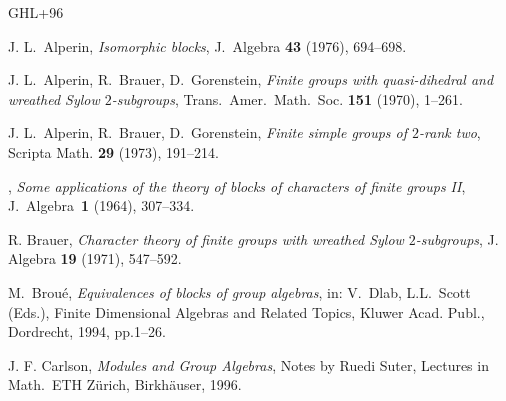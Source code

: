 \documentclass[12pt,a4paper]{amsart}
\theoremstyle{plain}\newtheorem{Theorem}{Theorem}[section]
\theoremstyle{plain}\newtheorem{Conjecture}[Theorem]{Conjecture}
\theoremstyle{plain}\newtheorem{Corollary}[Theorem]{Corollary}
\theoremstyle{plain}\newtheorem{Lemma}[Theorem]{Lemma}
\theoremstyle{plain}\newtheorem{Proposition}[Theorem]{Proposition}
\theoremstyle{definition}\newtheorem{Definition}[Theorem]{Definition}
\theoremstyle{definition}\newtheorem{Example}[Theorem]{Example}
\theoremstyle{definition}\newtheorem{Examples}[Theorem]{Examples}
\theoremstyle{definition}\newtheorem{Remark}[Theorem]{Remark}
\theoremstyle{definition}\newtheorem{Question}[Theorem]{Question}
\theoremstyle{definition}\newtheorem{Notation}[Theorem]{Notation}
\theoremstyle{definition}\newtheorem{Hypothesis}[Theorem]{Hypothesis}
\theoremstyle{definition}\newtheorem{Assumption}[Theorem]{Assumption}
\theoremstyle{definition}\newtheorem{Strategy}[Theorem]{Strategy}
\theoremstyle{definition}\newtheorem{Contents}[Theorem]{Contents}
\theoremstyle{definition}\newtheorem{Computations}[Theorem]{Computations}
\theoremstyle{definition}\newtheorem{Equivalences}[Theorem]{Equivalences}
\theoremstyle{definition}\newtheorem{Notation/Definition}[Theorem]{Notation/Definition}
\theoremstyle{definition}\newtheorem{noth}[Theorem]{}
\theoremstyle{plain}\newtheorem{Step}[Theorem]{Step}
\begin{document}
\begin{thebibliography}{GHL+96}

{\sc J. L.~Alperin}, \emph{Isomorphic blocks}, J.~Algebra \textbf{43} (1976),
694--698.

 {\sc J. L.~Alperin,
R.~Brauer, D.~Gorenstein}, 
\emph{Finite groups with quasi-dihedral and wreathed Sylow $2$-subgroups},
Trans.~Amer.~Math.~Soc. \textbf{151} (1970), 1--261. 

{\sc J. L.~Alperin, R.~Brauer, D.~Gorenstein}, 
\emph{Finite simple groups of $2$-rank two}, Scripta Math. 
\textbf{29} (1973), 191--214.





,
\emph{Some applications of the theory of blocks of characters of finite groups II},
J.~Algebra~\textbf{1} (1964), 307--334. 


{\sc R. Brauer}, \textit{Character theory of finite groups with wreathed {S}ylow
  {$2$}-subgroups}, J. Algebra \textbf{19} (1971), 547--592.

 {\sc M.~Brou\'e}, 
\emph{Equivalences of blocks of group algebras}, 
in: V.~Dlab, L.L.~Scott (Eds.), Finite Dimensional Algebras and Related Topics, 
Kluwer Acad. Publ., Dordrecht, 1994, pp.1--26.

{\sc J. F. Carlson},
\emph{Modules and Group Algebras},
Notes by Ruedi Suter,
Lectures in Math.~ETH Z{\"u}rich, Birkh{\"a}user, 1996.




\end{thebibliography}
\end{document}
